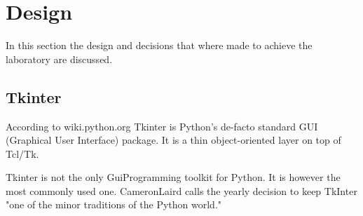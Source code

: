 \section{Design}\label{sec: Design}
In this section the design and decisions that where made to achieve the laboratory are discussed.

\subsection{Tkinter}\label{subsec: Tkinter}
According to wiki.python.org 
Tkinter is Python's de-facto standard GUI (Graphical User Interface) package. It is a thin object-oriented layer on top of Tcl/Tk.

Tkinter is not the only GuiProgramming toolkit for Python. It is however the most commonly used one. CameronLaird calls the yearly decision to keep TkInter "one of the minor traditions of the Python world."

